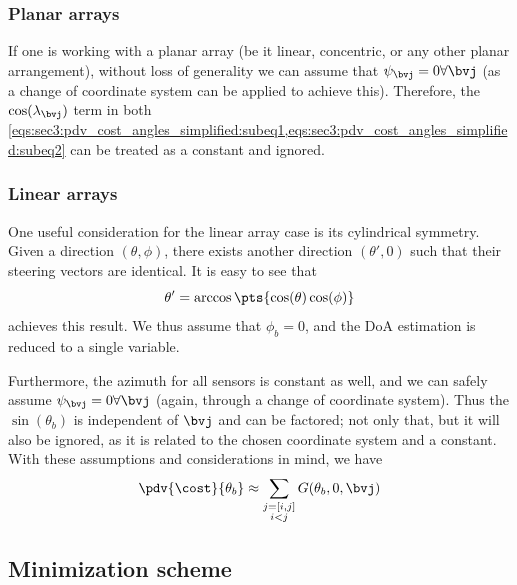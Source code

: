 \subsubsection*{Planar arrays}
If one is working with a planar array (be it linear, concentric, or any other planar arrangement), without loss of generality we can assume that $\psi_{\bvj} = 0 \forall \bvj$ (as a change of coordinate system can be applied to achieve this). Therefore, the $\cos(\lambda_{\bvj})$ term in both \cref{eqs:sec3:pdv_cost_angles_simplified:subeq1,eqs:sec3:pdv_cost_angles_simplified:subeq2} can be treated as a constant and ignored.

\subsubsection*{Linear arrays}

One useful consideration for the linear array case is its cylindrical symmetry. Given a direction $(\theta,\phi)$, there exists another direction $(\theta',0)$ such that their steering vectors are identical. It is easy to see that
\begin{equation}
	\theta' = \arccos\pts{\cos(\theta) \cos(\phi)}
\end{equation}
achieves this result. We thus assume that $\phi_b = 0$, and the DoA estimation is reduced to a single variable. 

Furthermore, the azimuth for all sensors is constant as well, and we can safely assume $\psi_{\bvj} = 0 \forall \bvj$ (again, through a change of coordinate system). Thus the $\sin(\theta_b)$ is independent of $\bvj$ and can be factored; not only that, but it will also be ignored, as it is related to the chosen coordinate system and a constant. With these assumptions and considerations in mind, we have
\begin{equation}
	\pdv{\cost}{\theta_b} \approx \sum_{\substack{j=[i,j]\\i<j}} G(\theta_b,0,\bvj)
\end{equation}

\subsection{Minimization scheme}

